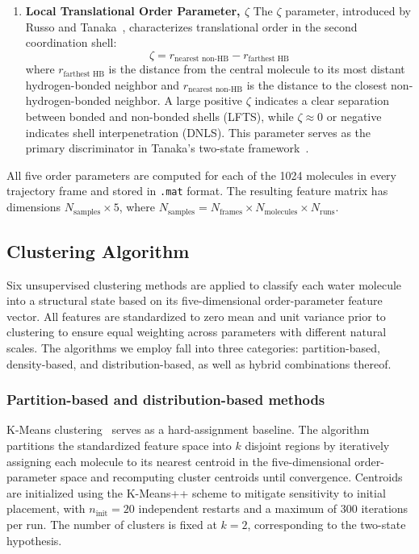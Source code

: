 \documentclass[aps, amsmath,amssymb, reprint, onecolumn,notitlepage,superscriptaddress]{revtex4-2}
\begin{document}
\begin{enumerate}
where $r_k$ is the radial distance to the nearest neighbor $k^\text{th}$ and $\Bar{r}$ is the average of the four radial distances. $S_k$ also has a maximum value of 1 which is seen when a tetrahedron is achieved. \cite{duboue-dijon_characterization_2015}

\item \textbf{Local Translational Order Parameter, $\zeta$}
The $\zeta$ parameter, introduced by Russo and Tanaka~\cite{russo_understanding_2014}, characterizes translational order in the second coordination shell:
\begin{equation}
\zeta = r_{\text{nearest non-HB}} - r_{\text{farthest HB}}
\label{eq:zeta}
\end{equation}
where $r_{\text{farthest HB}}$ is the distance from the central molecule to its most distant hydrogen-bonded neighbor and $r_{\text{nearest non-HB}}$ is the distance to the closest non-hydrogen-bonded neighbor. A large positive $\zeta$ indicates a clear separation between bonded and non-bonded shells (LFTS), while $\zeta \approx 0$ or negative indicates shell interpenetration (DNLS). This parameter serves as the primary discriminator in Tanaka's two-state framework~\cite{russo_understanding_2014, shi_microscopic_2018}.
\end{enumerate}

All five order parameters are computed for each of the 1024 molecules in every trajectory frame and stored in \texttt{.mat} format. The resulting feature matrix has dimensions $N_{\text{samples}} \times 5$, where $N_{\text{samples}} = N_{\text{frames}} \times N_{\text{molecules}} \times N_{\text{runs}}$.

\subsection{Clustering Algorithm}
\label{sec:clustering_algorithm}
Six unsupervised clustering methods are applied to classify each water molecule into a structural state based on its five-dimensional order-parameter feature vector. All features are standardized to zero mean and unit variance prior to clustering to ensure equal weighting across parameters with different natural scales. The algorithms we employ fall into three categories: partition-based, density-based, and distribution-based, as well as hybrid combinations thereof.~\cite{zheng-2018}

\subsubsection{Partition-based and distribution-based methods}
K-Means clustering~\cite{ikotun_k-means_2023} serves as a hard-assignment baseline. The algorithm partitions the standardized feature space into $k$ disjoint regions by iteratively assigning each molecule to its nearest centroid in the five-dimensional order-parameter space and recomputing cluster centroids until convergence. Centroids are initialized using the K-Means++ scheme to mitigate sensitivity to initial placement, with $n_{\text{init}} = 20$ independent restarts and a maximum of 300 iterations per run. The number of clusters is fixed at $k = 2$, corresponding to the two-state hypothesis.
\end{document}
